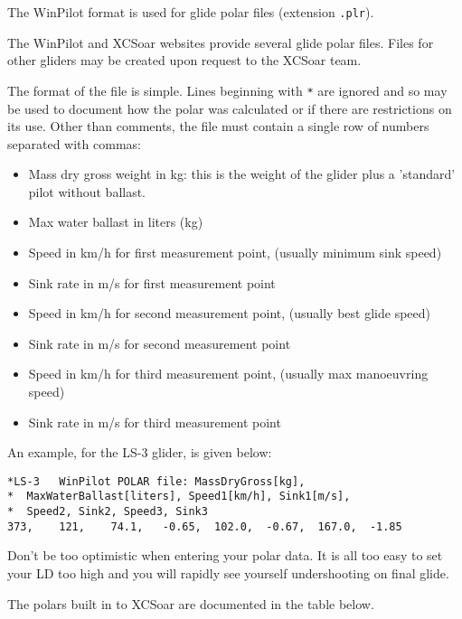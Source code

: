 The WinPilot format is used for glide polar files (extension \verb|.plr|).

The WinPilot and XCSoar websites provide several glide polar files.
Files for other gliders may be created upon request to the XCSoar
team.

The format of the file is simple.  Lines beginning with \verb|*| are
ignored and so may be used to document how the polar was calculated or
if there are restrictions on its use.  Other than comments, the file
must contain a single row of numbers separated with commas:
\begin{itemize}
\item Mass dry gross weight in kg: this is the weight of the glider plus
  a 'standard' pilot without ballast.
\item Max water ballast in liters (kg)
\item Speed in km/h for first measurement point, (usually minimum sink speed)
\item Sink rate in m/s for first measurement point
\item Speed in km/h for second measurement point, (usually best glide speed)
\item Sink rate in m/s for second measurement point
\item Speed in km/h for third measurement point, (usually max manoeuvring speed)
\item Sink rate in m/s for third measurement point
\end{itemize}

An example, for the LS-3 glider, is given below:
\begin{verbatim}
*LS-3	WinPilot POLAR file: MassDryGross[kg], 
*  MaxWaterBallast[liters], Speed1[km/h], Sink1[m/s], 
*  Speed2, Sink2, Speed3, Sink3  	
373,	121,	74.1,	-0.65,	102.0,	-0.67,	167.0,	-1.85
\end{verbatim}

\tip Don't be too optimistic when entering your polar data. It is all too
easy to set your LD too high and you will rapidly see yourself
undershooting on final glide.

The polars built in to XCSoar are documented in the table below.

